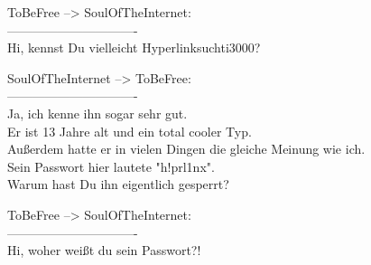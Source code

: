 \noindent \parbox{\textwidth}{

    \begin{footnotesize}
    \begin{itshape}
    \begin{flushright}

\noindent ToBeFree --> SoulOfTheInternet:\\
\noindent -------------------------------\\
\noindent Hi, kennst Du vielleicht Hyperlinksuchti3000?\\

    \end{flushright}
    \end{itshape}
    \end{footnotesize}

}


\noindent \parbox{\textwidth}{

    \begin{footnotesize}
    \begin{itshape}

\noindent SoulOfTheInternet --> ToBeFree:\\
\noindent -------------------------------\\
\noindent Ja, ich kenne ihn sogar sehr gut.\\
\noindent Er ist 13 Jahre alt und ein total cooler Typ.\\
\noindent Außerdem hatte er in vielen Dingen die gleiche Meinung wie ich.\\
\noindent Sein Passwort hier lautete "h!prl1nx".\\
\noindent Warum hast Du ihn eigentlich gesperrt?\\

    \end{itshape}
    \end{footnotesize}

}


\noindent \parbox{\textwidth}{

    \begin{footnotesize}
    \begin{itshape}
    \begin{flushright}

\noindent ToBeFree --> SoulOfTheInternet:\\
\noindent -------------------------------\\
\noindent Hi, woher weißt du sein Passwort?!\\

    \end{flushright}
    \end{itshape}
    \end{footnotesize}

}


